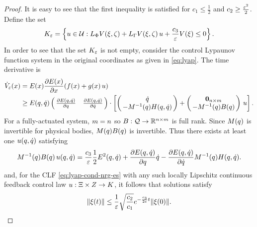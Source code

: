 \begin{proof}
  It is easy to see that the first inequality is satisfied for $c_{1} \leq \frac{1}{2}$ and $c_{2} \geq \frac{\varepsilon^{2}}{2}$.
  Define the set
  \begin{align}
    K_{\varepsilon} = \left\{ u \in \mathcal{U} : L_{\Phi} V(\xi, \zeta) + L_{\Gamma} V(\xi, \zeta) \, u + \frac{c_{3}}{\varepsilon} V(\xi) \leq 0 \right\}.
    \label{eq:control-set}
  \end{align}
  In order to see that the set $K_{\varepsilon}$ is not empty, consider the control Lypaunov function system in the original coordinates as given in \eqref{eq:lyap}.
  The time derivative is
  \begin{align}
    \dVe(\x) &= \E(\x) \pd{\E(\x)}{\x}(f(\x) + g(\x) \, \uu)\\
    \nonumber
    &\geq \E(\q, \dq) \left(\!\!\begin{array}{c c}
    \pd{\E(\q, \dq)}{\q} & \pd{\E(\q, \dq)}{\dq}
    \end{array}\!\!\right) \cdot
    \left[
      \left(\!\!\begin{array}{c}
      \dq\\
      -\M^{-1}(\q) \CG(\q, \dq)
      \end{array}\!\!\right) +
      \left(\!\!\begin{array}{c}
      \boldzero_{\ndim \times \ncv}\\
      -\M^{-1}(\q) \B(\q)
      \end{array}\!\!\right) \, \uu
      \right].
  \end{align}
  For a fully-actuated system, $m = n$ so $B : \mathcal{Q} \to \mathbb{R}^{n \times m}$ is full rank.
  Since $M(q)$ is invertible for physical bodies, $M(q) B(q)$ is invertible.
  Thus there exists at least one $u(q, \dot{q})$ satisfying
  \begin{align}
    M^{-1}(q) B(q) \, u(q, \dot{q}) = \frac{c_{3}}{\varepsilon} \frac{1}{2} E^{2}(q, \dot{q}) + \frac{\partial{E(q, \dot{q})}}{\partial{q}} \dot{q} - \frac{\partial{E(q, \dot{q})}}{\partial{\dot{q}}} M^{-1}(q) H(q, \dot{q}).
  \end{align}
  and, for the CLF \eqref{eq:lyap-cond-nrg-es} with any such locally Lipschitz continuous feedback control law $u : \Xi \times Z \to K$, it follows that solutions satisfy
  \begin{align}
    \label{eq:xt-bounds}
    \| \xi(t) \| \leq \frac{1}{\varepsilon} \sqrt{\frac{c_{2}}{c_{1}}} e^{-\frac{c_{3}}{2\varepsilon} t} \| \xi(0) \|.
  \end{align}
\end{proof}

